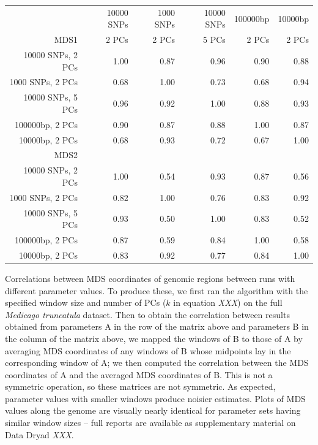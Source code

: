 \documentclass[11pt, oneside]{article}   	%
\newcommand{\plr}[1]{{\em \color{blue} #1}}
\begin{document}
\begin{table}[ht]
\centering
    \begin{tabular}{rrrrrr}
      \hline
          & 10000 SNPs & 1000 SNPs & 10000 SNPs & 100000bp & 10000bp \\ 
     MDS1 & 2 PCs & 2 PCs & 5 PCs & 2 PCs & 2 PCs \\ 
      \hline
  10000 SNPs, 2 PCs & 1.00 & 0.87 & 0.96 & 0.90 & 0.88 \\ 
  1000 SNPs, 2 PCs & 0.68 & 1.00 & 0.73 & 0.68 & 0.94 \\ 
  10000 SNPs, 5 PCs & 0.96 & 0.92 & 1.00 & 0.88 & 0.93 \\ 
  100000bp, 2 PCs & 0.90 & 0.87 & 0.88 & 1.00 & 0.87 \\ 
  10000bp, 2 PCs & 0.68 & 0.93 & 0.72 & 0.67 & 1.00 \\ 
       \hline
       \hline
        MDS2 & &&&&\\
      \hline
      10000 SNPs, 2 PCs & 1.00 & 0.54 & 0.93 & 0.87 & 0.56 \\ 
      1000 SNPs, 2 PCs & 0.82 & 1.00 & 0.76 & 0.83 & 0.92 \\ 
      10000 SNPs, 5 PCs & 0.93 & 0.50 & 1.00 & 0.83 & 0.52 \\ 
      100000bp, 2 PCs & 0.87 & 0.59 & 0.84 & 1.00 & 0.58 \\ 
      10000bp, 2 PCs & 0.83 & 0.92 & 0.77 & 0.84 & 1.00 \\ 
       \hline
    \end{tabular}
    \begin{caption}
        Correlations between MDS coordinates of genomic regions
        between runs with different parameter values.
        To produce these, 
        we first ran the algorithm with the specified window size and number of PCs 
        ($k$ in equation \plr{XXX})
        on the full \textit{Medicago truncatula} dataset.
        Then to obtain the correlation between results obtained from parameters A in the row of the matrix above
        and parameters B in the column of the matrix above,
        we mapped the windows of B to those of A by averaging MDS coordinates of any windows of B whose midpoints lay in the corresponding window of A;
        we then computed the correlation between the MDS coordinates of A and the averaged MDS coordinates of B.
        This is not a symmetric operation, so these matrices are not symmetric.
        As expected, parameter values with smaller windows produce noisier estimates.
        Plots of MDS values along the genome are visually nearly identical
        for parameter sets having similar window sizes --
        full reports are available as supplementary material on Data Dryad \plr{XXX}.
        \label{tab:param_cors}
    \end{caption}
\end{table}
\end{document}
